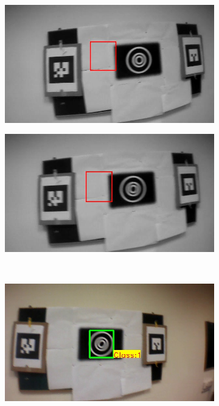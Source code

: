 \documentclass[runningheads]{llncs}
\begin{document}
\begin{figure}
\begin{subfigure}[b]{.19\textwidth}
\end{subfigure}
\begin{subfigure}[b]{.19\textwidth}
\includegraphics[width=\linewidth]{BLUT_output_01/14.jpg}
\end{subfigure}
\begin{subfigure}[b]{.19\textwidth}
\includegraphics[width=\linewidth]{BLUT_output_01/15.jpg}
\end{subfigure}\\
\begin{subfigure}[b]{.19\textwidth}
\includegraphics[width=\linewidth]{BLUT_input_01/output11.jpg}

\end{subfigure}
\end{figure}
\end{document}
